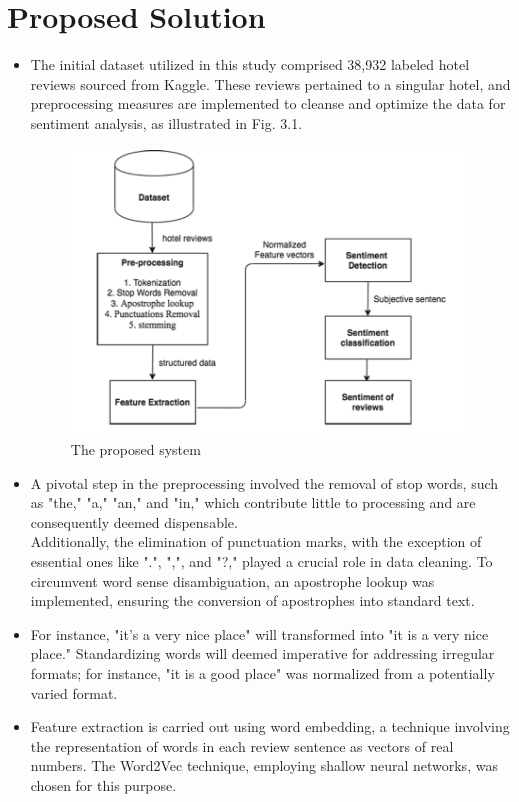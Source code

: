 \documentclass[a4paper, 12pt]{report}
\begin{document}
\section{Proposed Solution}
\begin{itemize}
	\item The initial dataset utilized in this study comprised 38,932 labeled hotel reviews sourced from Kaggle. These reviews pertained to a singular hotel, and preprocessing measures are implemented to cleanse and optimize the data for sentiment analysis, as illustrated in Fig. 3.1.\\
	\begin{figure}[h]
		\includegraphics[height=3in,width=6in]{a}
		\caption{The proposed system}
		\label{Fig.}
	\end{figure}
	\item A pivotal step in the preprocessing involved the removal of stop words, such as "the," "a," "an," and "in," which contribute little to processing and are consequently deemed dispensable.\\ Additionally, the elimination of punctuation marks, with the exception of essential ones like ".", ",", and "?," played a crucial role in data cleaning. To circumvent word sense disambiguation, an apostrophe lookup was implemented, ensuring the conversion of apostrophes into standard text. 
	\item For instance, "it's a very nice place" will transformed into "it is a very nice place." Standardizing words will deemed imperative for addressing irregular formats; for instance, "it is a good place" was normalized from a potentially varied format.
	\item Feature extraction is carried out using word embedding, a technique involving the representation of words in each review sentence as vectors of real numbers. The Word2Vec technique, employing shallow neural networks, was chosen for this purpose.

\end{itemize}
\end{document}
